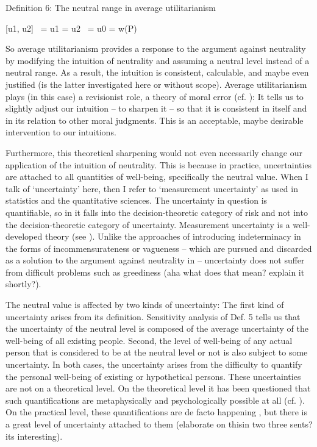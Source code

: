 Definition 6: The neutral range in average utilitarianism 

[u1, u2] \ = u1 = u2 \ = u0 = w(P) 

So average utilitarianism provides a response to the argument against neutrality by modifying the intuition of neutrality and assuming a neutral level instead of a neutral range. As a result, the intuition is consistent, calculable, and maybe even justified (is the latter investigated here or without scope). Average utilitarianism plays (in this case) a revisionist role, a theory of moral error (cf. ): It tells us to slightly adjust our intuition – to sharpen it – so that it is consistent in itself and in its relation to other moral judgments. This is an acceptable, maybe desirable intervention to our intuitions.  

Furthermore, this theoretical sharpening would not even necessarily change our application of the intuition of neutrality. This is because in practice, uncertainties are attached to all quantities of well-being, specifically the neutral value. When I talk of ‘uncertainty’ here, then I refer to ‘measurement uncertainty’ as used in statistics and the quantitative sciences. The uncertainty in question is quantifiable, so in it falls into the decision-theoretic category of risk and not into the decision-theoretic category of uncertainty. Measurement uncertainty is a well-developed theory (see ). Unlike the approaches of introducing indeterminacy in the forms of incommensurateness or vagueness – which are pursued and discarded as a solution to the argument against neutrality in  – uncertainty does not suffer from difficult problems such as greediness (aha what does that mean? explain it shortly?).  

The neutral value is affected by two kinds of uncertainty: The first kind of uncertainty arises from its definition. Sensitivity analysis of Def. 5 tells us that the uncertainty of the neutral level is composed of the average uncertainty of the well-being of all existing people. Second, the level of well-being of any actual person that is considered to be at the neutral level or not is also subject to some uncertainty. In both cases, the uncertainty arises from the difficulty to quantify the personal well-being of existing or hypothetical persons. These uncertainties are not on a theoretical level. On the theoretical level it has been questioned that such quantifications are metaphysically and psychologically possible at all (cf. ). On the practical level, these quantifications are de facto happening \cite[ch.~9]{broome_2004}, but there is a great level of uncertainty attached to them (elaborate on thisin two three sents? its interesting).  


